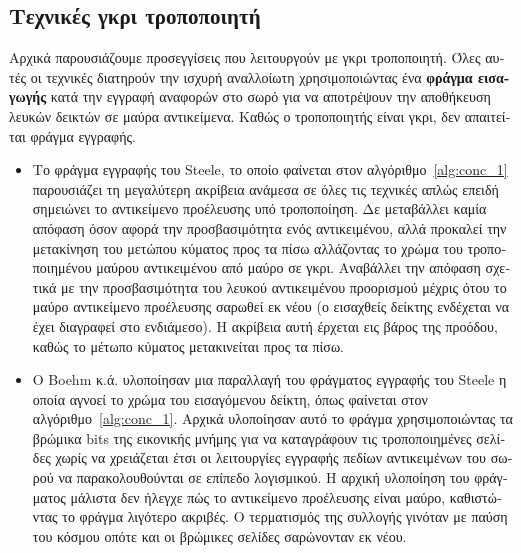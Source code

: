\begin{greek}
\subsection{Τεχνικές γκρι τροποποιητή}
Αρχικά παρουσιάζουμε προσεγγίσεις που λειτουργούν με γκρι τροποποιητή.
Όλες αυτές οι τεχνικές διατηρούν την ισχυρή αναλλοίωτη χρησιμοποιώντας
ένα \textbf{φράγμα εισαγωγής} κατά την εγγραφή αναφορών στο σωρό για
να αποτρέψουν την αποθήκευση λευκών δεικτών σε μαύρα αντικείμενα.
Καθώς ο τροποποιητής είναι γκρι, δεν απαιτείται φράγμα εγγραφής.

\begin{itemize}
  \item Το φράγμα εγγραφής του Steele, \cite{DBLP:journals/cacm/Steele75} το
    οποίο φαίνεται στον αλγόριθμο~\ref{alg:conc_1} παρουσιάζει
    τη μεγαλύτερη ακρίβεια ανάμεσα σε όλες τις τεχνικές απλώς επειδή
    σημειώνει το αντικείμενο προέλευσης υπό τροποποίηση. Δε μεταβάλλει
    καμία απόφαση όσον αφορά την προσβασιμότητα ενός αντικειμένου, αλλά
    προκαλεί την μετακίνηση του μετώπου κύματος προς τα πίσω αλλάζοντας
    το χρώμα του τροποποιημένου μαύρου αντικειμένου από μαύρο σε γκρι.
    Αναβάλλει την απόφαση σχετικά με την προσβασιμότητα του λευκού
    αντικειμένου προορισμού μέχρις ότου το μαύρο αντικείμενο προέλευσης
    σαρωθεί εκ νέου (ο εισαχθείς δείκτης ενδέχεται να έχει διαγραφεί
    στο ενδιάμεσο). Η ακρίβεια αυτή έρχεται εις βάρος της προόδου,
    καθώς το μέτωπο κύματος μετακινείται προς τα πίσω.

   \item Ο Boehm κ.ά. \cite{DBLP:conf/pldi/BoehmDS91} υλοποίησαν μια
   παραλλαγή του φράγματος εγγραφής του Steele η οποία αγνοεί το χρώμα του
   εισαγόμενου δείκτη, όπως φαίνεται στον αλγόριθμο~\ref{alg:conc_1}.
   Αρχικά υλοποίησαν αυτό το φράγμα χρησιμοποιώντας
   τα βρώμικα bits της εικονικής μνήμης για να καταγράφουν τις
   τροποποιημένες σελίδες χωρίς να χρειάζεται έτσι οι λειτουργίες
   εγγραφής πεδίων αντικειμένων του σωρού να παρακολουθούνται σε επίπεδο
   λογισμικού. Η αρχική υλοποίηση του φράγματος μάλιστα δεν ήλεγχε
   πώς το αντικείμενο προέλευσης είναι μαύρο, καθιστώντας το φράγμα
   λιγότερο ακριβές. Ο τερματισμός της συλλογής γινόταν με παύση
   του κόσμου οπότε και οι βρώμικες σελίδες σαρώνονταν εκ νέου.


\end{itemize}
\end{greek}
